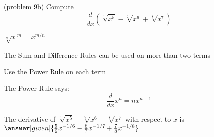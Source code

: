\documentclass{ximera}
\begin{document}
\begin{problem}(problem 9b)
  Compute 
  \[
  \frac{d}{dx} (\sqrt[6] {x^5} - \sqrt[7] {x^6} + \sqrt[8] {x^7})
  \]
  
    \begin{hint}
		 $\sqrt[n] x^m = x^{m/n}$
		\end{hint}
		\begin{hint}
		  The Sum and Difference Rules can be used on more than two terms
		\end{hint}
		\begin{hint}
      Use the Power Rule on each term
    \end{hint}
    \begin{hint}
      The Power Rule says:
      \[
      \frac{d}{dx} x^n = nx^{n-1}
      \]
    \end{hint}    
		The derivative of $\sqrt[6] {x^5} - \sqrt[7] {x^6} + \sqrt[8] {x^7}$ with respect to $x$ is
		 $\answer[given]{\frac56 x^{-1/6} - \frac67 x^{-1/7} + \frac78 x^{-1/8}}$
	
\end{problem}
\end{document}
